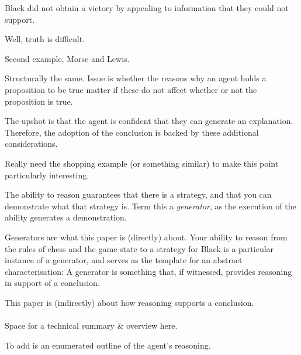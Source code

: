 \documentclass[10pt]{article}
\newcommand{\hozlinedash}[0]{%
  \noindent\hdashrule[0.5ex][c]{\textwidth}{.1pt}{2.5pt}
}
\begin{document}
\begin{note}[Why]
  Black did not obtain a victory by appealing to information that they could not support.

  Well, truth is difficult.

  Second example, Morse and Lewis.

  Structurally the same.
  Issue is whether the reasons why an agent holds a proposition to be true matter if these do not affect whether or not the proposition is true.
\end{note}



\hozlinedash



\begin{note}
  The upshot is that the agent is confident that they can generate an explanation.
  Therefore, the adoption of the conclusion is backed by these additional considerations.

  Really need the shopping example (or something similar) to make this point particularly interesting.

  \hozlinedash

  The ability to reason guarantees that there is a strategy, and that you can demonstrate what that strategy is.
  Term this a \emph{generator}, as the execution of the ability generates a demonstration.

  Generators are what this paper is (directly) about.
  Your ability to reason from the rules of chess and the game state to a strategy for Black is a particular instance of a generator, and serves as the template for an abstract characterisation:
  A generator is something that, if witnessed, provides reasoning in support of a conclusion.

  This paper is (indirectly) about how reasoning supports a conclusion.
\end{note}

\hozlinedash

\paragraph{ }
\begin{note}
  Space for a technical summary \& overview here.

  To add is an enumerated outline of the agent's reasoning.
\end{note}
\end{document}

